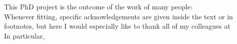 \begin{acknowledgements}
\addchaptertocentry{\acknowledgementname} %
This PhD project is the outcome of the work of many people: 
\\
Whenever fitting, specific acknowledgements are given inside the text or in footnotes, but here I would especially like to thank all of my colleagues at \\
In particular, 





\end{acknowledgements}